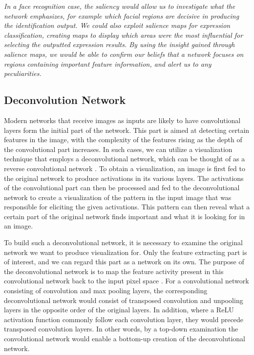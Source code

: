 \noindent \textit{In a face recognition case, the saliency would allow us to investigate what the network emphasizes, for example which facial regions are decisive in producing the identification output. We could also exploit salience maps for expression classification, creating maps to display which areas were the most influential for selecting the outputted expression results. By using the insight gained through salience maps, we would be able to confirm our beliefs that a network focuses on regions containing important feature information, and alert us to any peculiarities.}

\subsection{Deconvolution Network}

Modern networks that receive images as inputs are likely to have convolutional layers form the initial part of the network. This part is aimed at detecting certain features in the image, with the complexity of the features rising as the depth of the convolutional part increases. In such cases, we can utilize a visualization technique that employs a deconvolutional network, which can be thought of as a reverse convolutional network \cite{deconv_net}. To obtain a visualization, an image is first fed to the original network to produce activations in its various layers. The activations of the convolutional part can then be processed and fed to the deconvolutional network to create a visualization of the pattern in the input image that was responsible for eliciting the given activations. This pattern can then reveal what a certain part of the original network finds important and what it is looking for in an image.

To build such a deconvolutional network, it is necessary to examine the original network we want to produce visualization for. Only the feature extracting part is of interest, and we can regard this part as a network on its own. The purpose of the deconvolutional network is to map the feature activity present in this convolutional network back to the input pixel space \cite{deconv_vis}. For a convolutional network consisting of convolution and max pooling layers, the corresponding deconvolutional network would consist of transposed convolution and unpooling layers in the opposite order of the original layers. In addition, where a ReLU activation function commonly follow each convolution layer, they would precede transposed convolution layers. In other words, by a top-down examination the convolutional network would enable a bottom-up creation of the deconvolutional network. 

